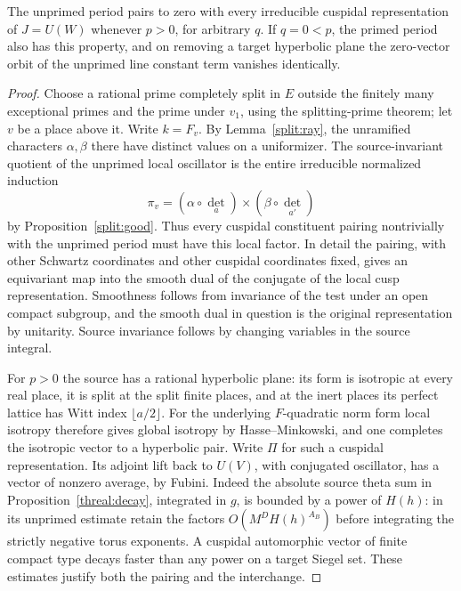 \begin{proposition}\label{threal:orthA}
The unprimed period pairs to zero with every irreducible cuspidal
representation of \(J=U(W)\) whenever \(p>0\), for arbitrary \(q\).
If \(q=0<p\), the primed period also has this property, and on
removing a target hyperbolic plane the zero-vector orbit of the
unprimed line constant term vanishes identically.
\end{proposition}
\begin{proof}
Choose a rational prime completely split in \(E\) outside the finitely
many exceptional primes and the prime under \(v_1\), using the
splitting-prime theorem; let \(v\)
be a place above it. Write \(k=F_v\). By Lemma~\ref{split:ray}, the
unramified characters \(\alpha,\beta\) there have distinct values
on a uniformizer. The source-invariant quotient of the unprimed local
oscillator is the entire irreducible normalized induction
\[
       \pi_v=(\alpha\circ\det_a)\times(\beta\circ\det_{a'})
\]
by Proposition~\ref{split:good}. Thus every cuspidal constituent
pairing nontrivially with the unprimed period must have this local
factor. In detail the pairing, with other Schwartz coordinates and
other cuspidal coordinates fixed, gives an equivariant map into
the smooth dual of the conjugate of the local cusp representation.
Smoothness follows from invariance of the test under an open
compact subgroup, and the smooth dual in question is the original
representation by unitarity. Source invariance follows by changing
variables in the source integral.

For \(p>0\) the source has a rational hyperbolic plane: its form is
isotropic at every real place, it is split at the split finite places,
and at the inert places its perfect lattice has Witt index \(\lfloor
a/2\rfloor\). For the underlying \(F\)-quadratic norm form local
isotropy therefore gives global isotropy by Hasse--Minkowski, and
one completes the isotropic vector to a hyperbolic pair.
Write \(\Pi\) for such a cuspidal representation. Its adjoint lift
back to \(U(V)\), with conjugated oscillator, has a vector of
nonzero average, by Fubini. Indeed the absolute source theta sum in
Proposition~\ref{threal:decay}, integrated in \(g\), is bounded by
a power of \(H(h)\): in its unprimed estimate retain the factors
\(O(M^D H(h)^{A_B})\) before integrating the strictly negative
torus exponents. A cuspidal automorphic vector of finite compact
type decays faster than any power on a target Siegel set.
These estimates justify both the pairing and the interchange.


\end{proof}
